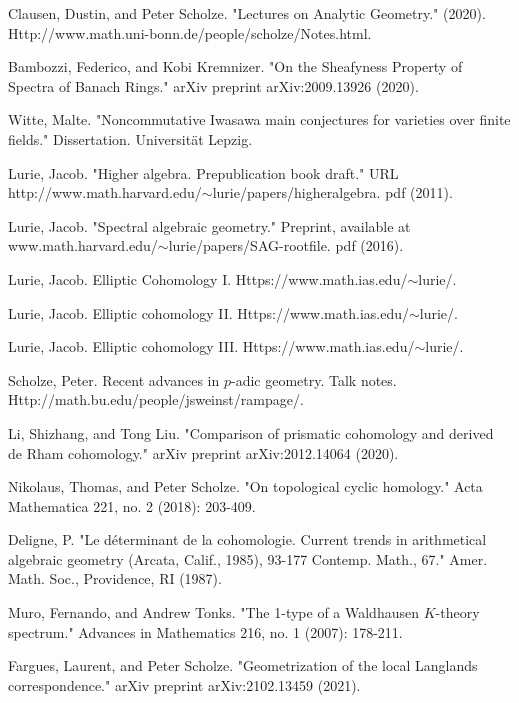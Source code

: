 \documentclass[11pt]{report}
\begin{document}
\begin{thebibliography}{1}
 Clausen, Dustin, and Peter Scholze. "Lectures on Analytic Geometry." (2020). Http://www.math.uni-bonn.de/people/scholze/Notes.html.


 Bambozzi, Federico, and Kobi Kremnizer. "On the Sheafyness Property of Spectra of Banach Rings." arXiv preprint arXiv:2009.13926 (2020).



 Witte, Malte. "Noncommutative Iwasawa main conjectures for varieties over finite fields." Dissertation. Universit\"at Lepzig.

 Lurie, Jacob. "Higher algebra. Prepublication book draft." URL http://www.math.harvard.edu/$\sim$lurie/papers/higheralgebra. pdf (2011). 

 Lurie, Jacob. "Spectral algebraic geometry." Preprint, available at www.math.harvard.edu/$\sim$lurie/papers/SAG-rootfile. pdf (2016).




 Lurie, Jacob. Elliptic Cohomology I. Https://www.math.ias.edu/$\sim$lurie/.

 Lurie, Jacob. Elliptic cohomology II. Https://www.math.ias.edu/$\sim$lurie/.

 Lurie, Jacob. Elliptic cohomology III. Https://www.math.ias.edu/$\sim$lurie/.

 Scholze, Peter. Recent advances in $p$-adic geometry. Talk notes. Http://math.bu.edu/people/jsweinst/rampage/.


 Li, Shizhang, and Tong Liu. "Comparison of prismatic cohomology and derived de Rham cohomology." arXiv preprint arXiv:2012.14064 (2020).


 Nikolaus, Thomas, and Peter Scholze. "On topological cyclic homology." Acta Mathematica 221, no. 2 (2018): 203-409.



 Deligne, P. "Le d\'eterminant de la cohomologie. Current trends in arithmetical algebraic geometry (Arcata, Calif., 1985), 93-177 Contemp. Math., 67." Amer. Math. Soc., Providence, RI (1987).

 Muro, Fernando, and Andrew Tonks. "The 1-type of a Waldhausen $K$-theory spectrum." Advances in Mathematics 216, no. 1 (2007): 178-211.


 Fargues, Laurent, and Peter Scholze. "Geometrization of the local Langlands correspondence." arXiv preprint arXiv:2102.13459 (2021).



\end{thebibliography}
\end{document}
